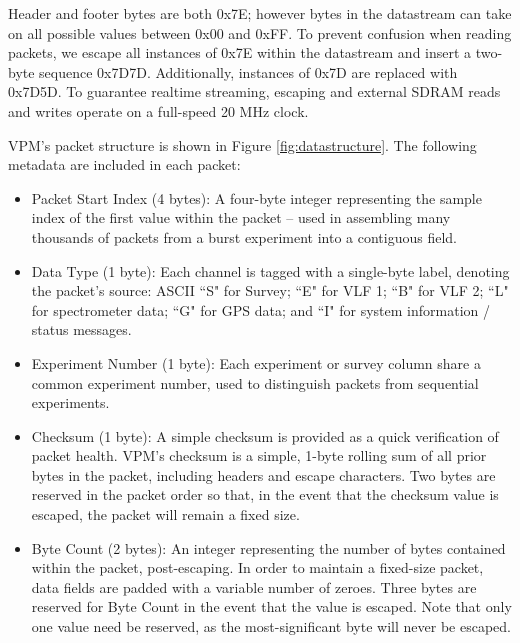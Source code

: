 Header and footer bytes are both 0x7E; however bytes in the datastream can take on all possible values between 0x00 and 0xFF. To prevent confusion when reading packets, we escape all instances of 0x7E within the datastream and insert a two-byte sequence 0x7D7D. Additionally, instances of 0x7D are replaced with 0x7D5D. To guarantee realtime streaming, escaping and external SDRAM reads and writes operate on a full-speed 20 MHz clock. 

VPM's packet structure is shown in Figure \ref{fig:datastructure}. The following metadata are included in each packet:
\begin{itemize}
\item Packet Start Index (4 bytes): A four-byte integer representing the sample index of the first value within the packet -- used in assembling many thousands of packets from a burst experiment into a contiguous field.
\item Data Type (1 byte): Each channel is tagged with a single-byte label, denoting the packet's source: ASCII ``S" for Survey; ``E" for VLF 1; ``B" for VLF 2; ``L" for spectrometer data; ``G" for GPS data; and ``I" for system information / status messages.
\item Experiment Number (1 byte): Each experiment or survey column share a common experiment number, used to distinguish packets from sequential experiments.
\item Checksum (1 byte): A simple checksum is provided as a quick verification of packet health. VPM's checksum is a simple, 1-byte rolling sum of all prior bytes in the packet, including headers and escape characters. Two bytes are reserved in the packet order so that, in the event that the checksum value is escaped, the packet will remain a fixed size.

\item Byte Count (2 bytes): An integer representing the number of bytes contained within the packet, post-escaping. In order to maintain a fixed-size packet, data fields are padded with a variable number of zeroes. Three bytes are reserved for Byte Count in the event that the value is escaped. Note that only one value need be reserved, as the most-significant byte will never be escaped.
\end{itemize}

